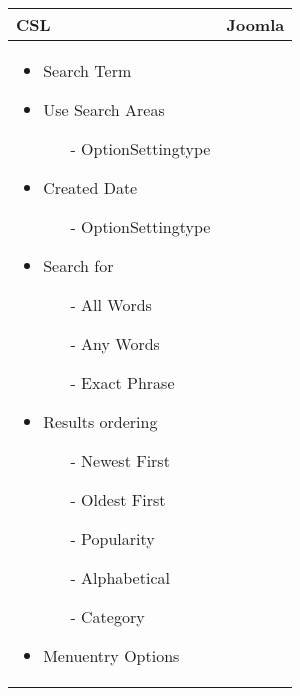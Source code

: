 \begin{minipage}{0.7\textwidth}
\begin{tabular}{|p{} | p{}|}
\hline
\textbf{CSL} & \textbf{Joomla} \\ 
\hline
\begin{itemize}
 \item Search Term 
 \item Use Search Areas
 \begin{enumerate}
  	\item[-] OptionSettingtype
  \end{enumerate} 
 \item Created Date
 \begin{enumerate}
  	\item[-] OptionSettingtype
  \end{enumerate}
 \item Search for
 \begin{enumerate}
  	\item[-] All Words
  	\item[-] Any Words
  	\item[-] Exact Phrase
  \end{enumerate} 
 \item Results ordering
 \begin{enumerate}
  	\item[-] Newest First
  	\item[-] Oldest First
  	\item[-] Popularity
  	\item[-] Alphabetical
  	\item[-] Category
  \end{enumerate} 
  \item Menuentry Options
 \end{itemize}


\end{tabular}
\end{minipage}
